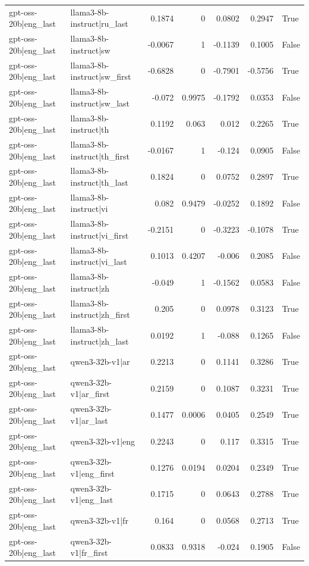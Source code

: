 \begin{table}
\begin{tabular}{l l r r r r l}
gpt-oss-20b|eng_last & llama3-8b-instruct|ru_last & 0.1874 & 0 & 0.0802 & 0.2947 & True \\
gpt-oss-20b|eng_last & llama3-8b-instruct|sw & -0.0067 & 1 & -0.1139 & 0.1005 & False \\
gpt-oss-20b|eng_last & llama3-8b-instruct|sw_first & -0.6828 & 0 & -0.7901 & -0.5756 & True \\
gpt-oss-20b|eng_last & llama3-8b-instruct|sw_last & -0.072 & 0.9975 & -0.1792 & 0.0353 & False \\
gpt-oss-20b|eng_last & llama3-8b-instruct|th & 0.1192 & 0.063 & 0.012 & 0.2265 & True \\
gpt-oss-20b|eng_last & llama3-8b-instruct|th_first & -0.0167 & 1 & -0.124 & 0.0905 & False \\
gpt-oss-20b|eng_last & llama3-8b-instruct|th_last & 0.1824 & 0 & 0.0752 & 0.2897 & True \\
gpt-oss-20b|eng_last & llama3-8b-instruct|vi & 0.082 & 0.9479 & -0.0252 & 0.1892 & False \\
gpt-oss-20b|eng_last & llama3-8b-instruct|vi_first & -0.2151 & 0 & -0.3223 & -0.1078 & True \\
gpt-oss-20b|eng_last & llama3-8b-instruct|vi_last & 0.1013 & 0.4207 & -0.006 & 0.2085 & False \\
gpt-oss-20b|eng_last & llama3-8b-instruct|zh & -0.049 & 1 & -0.1562 & 0.0583 & False \\
gpt-oss-20b|eng_last & llama3-8b-instruct|zh_first & 0.205 & 0 & 0.0978 & 0.3123 & True \\
gpt-oss-20b|eng_last & llama3-8b-instruct|zh_last & 0.0192 & 1 & -0.088 & 0.1265 & False \\
gpt-oss-20b|eng_last & qwen3-32b-v1|ar & 0.2213 & 0 & 0.1141 & 0.3286 & True \\
gpt-oss-20b|eng_last & qwen3-32b-v1|ar_first & 0.2159 & 0 & 0.1087 & 0.3231 & True \\
gpt-oss-20b|eng_last & qwen3-32b-v1|ar_last & 0.1477 & 0.0006 & 0.0405 & 0.2549 & True \\
gpt-oss-20b|eng_last & qwen3-32b-v1|eng & 0.2243 & 0 & 0.117 & 0.3315 & True \\
gpt-oss-20b|eng_last & qwen3-32b-v1|eng_first & 0.1276 & 0.0194 & 0.0204 & 0.2349 & True \\
gpt-oss-20b|eng_last & qwen3-32b-v1|eng_last & 0.1715 & 0 & 0.0643 & 0.2788 & True \\
gpt-oss-20b|eng_last & qwen3-32b-v1|fr & 0.164 & 0 & 0.0568 & 0.2713 & True \\
gpt-oss-20b|eng_last & qwen3-32b-v1|fr_first & 0.0833 & 0.9318 & -0.024 & 0.1905 & False \\

\end{tabular}
\end{table}
